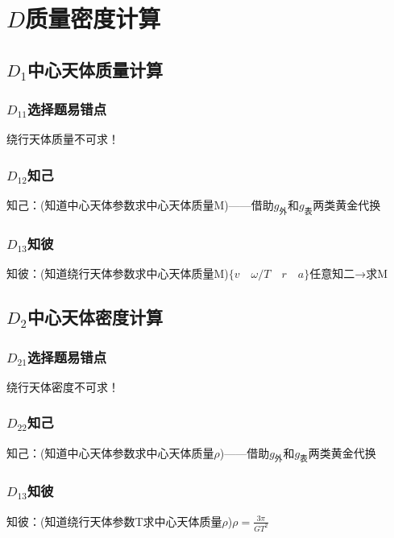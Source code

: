 \documentclass[lang=cn,10pt]{elegantbook}
\begin{document}
	       \vspace{1cm}
	       
	       \section{$D$质量密度计算}
	       \subsection{$D_1$中心天体质量计算}
	       \subsubsection{$D_{11}$选择题易错点}
	       
	       绕行天体质量不可求！
	       
	       \subsubsection{$D_{12}$知己}
	       知己：(知道中心天体参数求中心天体质量M)——借助$g_{\text{外}}$和$g_{\text{表}}$两类黄金代换
	       
	       \subsubsection{$D_{13}$知彼}
	       知彼：(知道绕行天体参数求中心天体质量M)$\{v\quad\omega/T \quad r\quad a\}$任意知二→求M
	       \vspace{2cm}
	       
	       \subsection{$D_2$中心天体密度计算}
	        \subsubsection{$D_{21}$选择题易错点}
	       
	       绕行天体密度不可求！
	       
	       \subsubsection{$D_{22}$知己}
	       知己：(知道中心天体参数求中心天体质量$\rho$)——借助$g_{\text{外}}$和$g_{\text{表}}$两类黄金代换
	       
	       \subsubsection{$D_{13}$知彼}
	       知彼：(知道绕行天体参数T求中心天体质量$\rho$)$\rho=\frac{3\pi}{GT^2}$
	       \vspace{2cm}
	       
\end{document}
